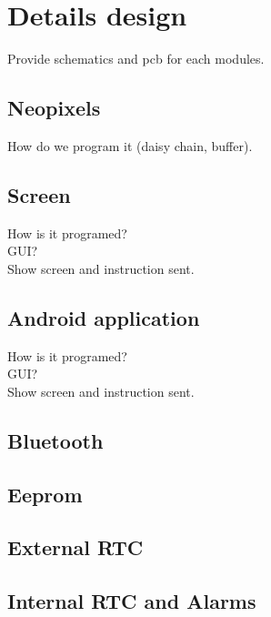 \section{Details design}
Provide schematics and pcb for each modules.
\subsection{Neopixels}
How do we program it (daisy chain, buffer).\\
\subsection{Screen}
How is it programed?\\
GUI?\\
Show screen and instruction sent.
\subsection{Android application}
How is it programed?\\
GUI?\\
Show screen and instruction sent.
\subsection{Bluetooth}
\subsection{Eeprom}
\subsection{External RTC}
\subsection{Internal RTC and Alarms}
